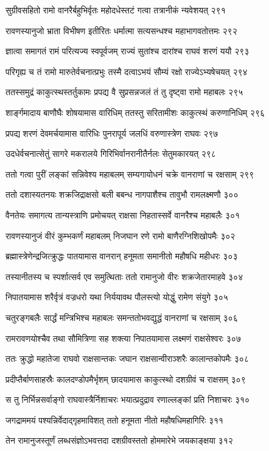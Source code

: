 सुग्रीवसहितो रामो वानरैर्बहुभिर्वृतः
महोदधेस्तटं गत्वा तत्रानीकं न्यवेशयत् २९१

रावणस्यानुजो भ्राता विभीषण इतीरितः
धर्मात्मा सत्यसन्धश्च महाभागवतोत्तमः २९२

ज्ञात्वा समागतं रामं परित्यज्य स्वपूर्वजम्
राज्यं सुतांश्च दारांश्च राघवं शरणं ययौ २९३

परिगृह्य च तं रामो मारुतेर्वचनात्प्रभुः
तस्मै दत्वाऽभयं सौम्यं रक्षो राज्येऽभ्यषेचयत् २९४

ततस्समुद्रं काकुत्स्थस्तर्तुकामः प्रपद्य वै
सुप्रसन्नजलं तं तु दृष्ट्वा रामो महाबलः २९५

शार्ङ्गमादाय बाणौघैः शोषयामास वारिधिम्
ततस्तु सरितामीशः काकुत्स्थं करुणानिधिम् २९६

प्रपद्य शरणं देवमर्चयामास वारिधिः
पुनरापूर्य जलधिं वरुणास्त्रेण राघवः २९७

उदधेर्वचनात्सेतुं सागरे मकरालये
गिरिभिर्वानरानीतैर्नलः सेतुमकारयत् २९८

ततो गत्वा पुरीं लङ्कां सन्निवेश्य महाबलम्
सम्यगायोधनं चक्रे वानराणां च रक्षसाम् २९९

ततो दशास्यतनयः शक्रजिद्राक्षसो बली
बबन्ध नागपाशैश्च तावुभौ रामलक्ष्मणौ ३००

वैनतेयः समागत्य तान्यस्त्राणि प्रमोचयत्
राक्षसा निहतास्सर्वे वानरैश्च महाबलैः ३०१

रावणस्यानुजं वीरं कुम्भकर्णं महाबलम्
निजघान रणे रामो बाणैरग्निशिखोपमैः ३०२

ब्रह्मास्त्रेणेन्द्रजित्क्रुद्धः पातयामास वानरान्
हनूमता समानीतो महौषधि महीधरः ३०३

तस्यानीतस्य च स्पर्शात्सर्व एव समुत्थिताः
ततो रामानुजो वीरः शक्रजेतारमाहवे ३०४

निपातयामास शरैर्वृत्रं वज्रधरो यथा
निर्ययावथ पौलस्त्यो योद्धुं रामेण संयुगे ३०५

चतुरङ्गबलैः सार्द्धं मन्त्रिभिश्च महाबलः
समन्ततोभवद्युद्धं वानराणां च रक्षसाम् ३०६

रामरावणयोश्चैव तथा सौमित्रिणा सह
शक्त्या निपातयामास लक्ष्मणं राक्षसेश्वरः ३०७

ततः क्रुद्धो महातेजा राघवो राक्षसान्तकः
जघान राक्षसान्वीराञ्शरैः कालान्तकोपमैः ३०८

प्रदीप्तैर्बाणसाहस्रैः कालदण्डोपमैर्भृशम्
छादयामास काकुत्स्थो दशग्रीवं च राक्षसम् ३०९

स तु निर्भिन्नसर्वाङ्गो राघवास्त्रैर्निशाचरः
भयात्प्रदुद्राव रणाल्लङ्कां प्रति निशाचरः ३१०

जगद्राममयं पश्यन्निर्वेदाद्गृहमाविशत्
ततो हनूमता नीतो महौषधिमहागिरिः ३११

तेन रामानुजस्तूर्णं लब्धसंज्ञोऽभवत्तदा
दशग्रीवस्ततो होममारेभे जयकाङ्क्षया ३१२

